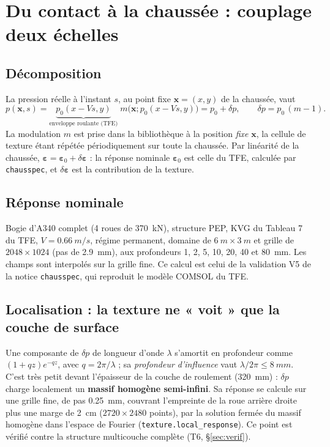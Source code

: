 \documentclass[11pt,a4paper]{article}
\newcommand{\cs}{\texttt{chausspec}}
\renewcommand{\epsilon}{\varepsilon}
\begin{document}
\section{Du contact à la chaussée : couplage deux échelles}\label{sec:couplage}
\subsection{Décomposition}
La pression réelle à l'instant $s$, au point fixe $\bm x=(x,y)$ de la chaussée, vaut
\begin{equation}
p(\bm x,s)=\underbrace{p_0(x-Vs,y)}_{\text{enveloppe roulante (TFE)}}\;m\bigl(\bm x;p_0(x-Vs,y)\bigr)
= p_0+\delta p,\qquad \delta p=p_0\,(m-1) .
\end{equation}
La modulation $m$ est prise dans la bibliothèque à la position \emph{fixe} $\bm x$, la cellule de
texture étant répétée périodiquement sur toute la chaussée. Par linéarité de la chaussée,
$\bm\epsilon=\bm\epsilon_0+\delta\bm\epsilon$ : la réponse nominale $\bm\epsilon_0$ est celle du
TFE, calculée par \cs, et $\delta\bm\epsilon$ est la contribution de la texture.

\subsection{Réponse nominale}
Bogie d'A340 complet (4 roues de \SI{370}{kN}), structure PEP, KVG du Tableau 7 du TFE,
$V=\SI{0.66}{m/s}$, régime permanent, domaine de $\SI{6}{m}\times\SI{3}{m}$ et grille de
$2048\times1024$ (pas de \SI{2.9}{mm}), aux profondeurs 1, 2, 5, 10, 20, 40 et \SI{80}{mm}.
Les champs sont interpolés sur la grille fine. Ce calcul est celui de la validation V5 de la
notice \cs, qui reproduit le modèle COMSOL du TFE.

\subsection{Localisation : la texture ne « voit » que la couche de surface}
Une composante de $\delta p$ de longueur d'onde $\lambda$ s'amortit en profondeur comme
$(1+qz)e^{-qz}$, avec $q=2\pi/\lambda$ ; sa \emph{profondeur d'influence} vaut
$\lambda/2\pi\le\SI{8}{mm}$. C'est très petit devant l'épaisseur de la couche de roulement
(\SI{320}{mm}) : $\delta p$ charge localement un \textbf{massif homogène semi-infini}. Sa réponse
se calcule sur une grille fine, de pas \SI{0.25}{mm}, couvrant l'empreinte de la roue arrière
droite plus une marge de \SI{2}{cm} ($2720\times2480$ points), par la solution fermée du massif
homogène dans l'espace de Fourier (\texttt{texture.local\_response}). Ce point est vérifié contre
la structure multicouche complète (T6, \S\ref{sec:verif}).
\end{document}
